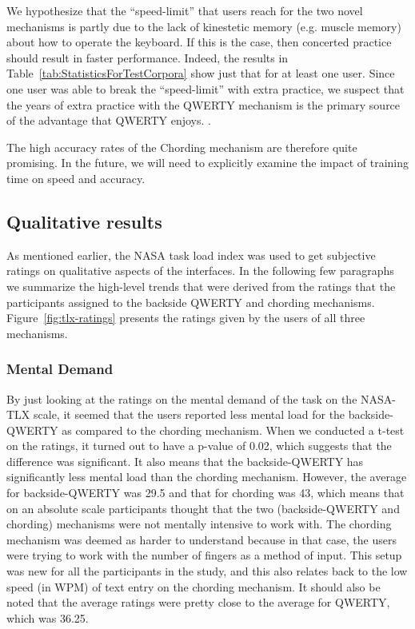 We hypothesize that the ``speed-limit'' that users reach for the two
novel mechanisms is partly due to the lack of kinestetic memory
(e.g. muscle memory) about how to operate the keyboard.  If this is
the case, then concerted practice should result in faster performance.
Indeed, the results in Table~\ref{tab:StatisticsForTestCorpora} show
just that for at least one user.  Since one user was able to break the
``speed-limit'' with extra practice, we suspect that the years of
extra practice with the QWERTY mechanism is the primary source of the
advantage that QWERTY enjoys. .

The high accuracy rates of the Chording mechanism are therefore quite
promising.  In the future, we will need to explicitly examine the
impact of training time on speed and accuracy.

\subsection{Qualitative results}

As mentioned earlier, the NASA task load index was used to get
subjective ratings on qualitative aspects of the interfaces. In the following few paragraphs we summarize the
high-level trends that were derived from the ratings that the
participants assigned to the backside QWERTY and chording
mechanisms. Figure~\ref{fig:tlx-ratings} presents the ratings given by
the users of all three mechanisms.

\subsubsection{Mental Demand}

By just looking at the ratings on the mental demand of the task on the
NASA-TLX scale, it seemed that the users reported less mental load for
the backside-QWERTY as compared to the chording mechanism. When we
conducted a t-test on the ratings, it turned out to have a p-value of
0.02, which suggests that the difference was significant. It also
means that the backside-QWERTY has significantly less mental load than
the chording mechanism. However, the average for backside-QWERTY was
29.5 and that for chording was 43, which means that on an absolute
scale participants thought that the two (backside-QWERTY and chording) mechanisms were not mentally
intensive to work with. The chording mechanism was deemed as harder to
understand because in that case, the users were trying to work with
the number of fingers as a method of input. This setup was new for all
the participants in the study, and this also relates back to the low
speed (in WPM) of text entry on the chording mechanism. It should also be noted that the average ratings were pretty close to the average for QWERTY, which was 36.25.

